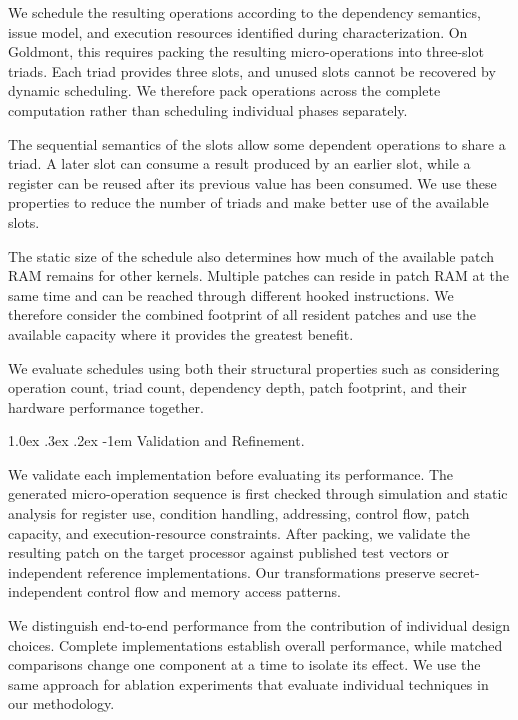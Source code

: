 \documentclass[journal=tches,submission]{iacrtrans}
\makeatletter
\renewcommand\paragraph{\@startsection{paragraph}{4}{\z@}%
      {1.0ex \@plus .3ex \@minus .2ex}%
      {-1em}%
      {\normalfont\normalsize\bfseries\SS@parafont}}
\makeatother
\begin{document}
We schedule the resulting operations according to the dependency semantics, issue model, and execution resources identified during characterization.
On Goldmont, this requires packing the resulting micro-operations into three-slot triads.
Each triad provides three slots, and unused slots cannot be recovered by dynamic scheduling.
We therefore pack operations across the complete computation rather than scheduling individual phases separately.

The sequential semantics of the slots allow some dependent operations to share a triad.
A later slot can consume a result produced by an earlier slot, while a register can be reused after its previous value has been consumed.
We use these properties to reduce the number of triads and make better use of the available slots.

The static size of the schedule also determines how much of the available patch RAM remains for other kernels.
Multiple patches can reside in patch RAM at the same time and can be reached through different hooked instructions.
We therefore consider the combined footprint of all resident patches and use the available capacity where it provides the greatest benefit.

We evaluate schedules using both their structural properties such as considering operation count, triad count, dependency depth, patch footprint, and their hardware performance together.

\paragraph{Validation and Refinement.}
\label{sec:method-validation}

We validate each implementation before evaluating its performance.
The generated micro-operation sequence is first checked through simulation and static analysis for register use, condition handling, addressing, control flow, patch capacity, and execution-resource constraints.
After packing, we validate the resulting patch on the target processor against published test vectors or independent reference implementations.
Our transformations preserve secret-independent control flow and memory access patterns.

We distinguish end-to-end performance from the contribution of individual design choices.
Complete implementations establish overall performance, while matched comparisons change one component at a time to isolate its effect.
We use the same approach for ablation experiments that evaluate individual techniques in our methodology.
\end{document}
